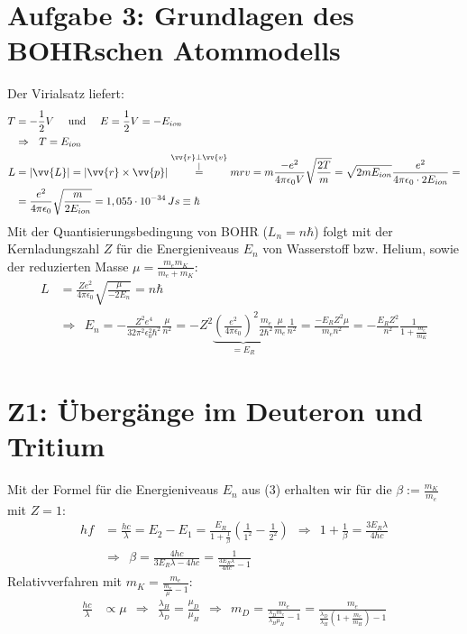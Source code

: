 \documentclass[a4paper,12pt]{article}
\begin{document}
\section*{Aufgabe 3: Grundlagen des BOHRschen Atommodells}
Der Virialsatz liefert:
\begin{align*}
T&=-\frac{1}{2}V\ \ \ \ \mathrm{und }\ \ \ \ E=\frac{1}{2}V=-E_{ion}\\
&\Rightarrow\ \ T=E_{ion}\\
L&=|\vv{L}|=|\vv{r}\times\vv{p}|\overset{\substack{\vv{r}\bot \vv{v}\\|}}{=}mrv=m\frac{-e^2}{4\pi\epsilon_0 V}\sqrt{\frac{2T}{m}}=\sqrt{2mE_{ion}}\frac{e^2}{4\pi\epsilon_0 \cdot 2E_{ion}}= \\
&=\frac{e^2}{4\pi\epsilon_0}\sqrt{\frac{m}{2E_{ion}}}=1,055\cdot 10^{-34}\, Js\equiv\hbar
\end{align*}
Mit der Quantisierungsbedingung von BOHR ($L_n=n\hbar$) folgt mit der Kernladungszahl $Z$ für die Energieniveaus $E_n$ von Wasserstoff bzw. Helium, sowie der reduzierten Masse $\mu = \frac{m_em_K}{m_e+m_K}$:
\begin{align*}
L&=\frac{Ze^2}{4\pi\epsilon_0}\sqrt{\frac{\mu}{-2E_n}}=n\hbar\\ &\Rightarrow\ \ E_n=-\frac{Z^2e^4}{32\pi^2\epsilon_0^2\hbar^2}\frac{\mu}{n^2}=-Z^2\underbrace{\left(\frac{e^2}{4\pi\epsilon_0}\right)^2\frac{m_e}{2\hbar^2}}_{=E_R}\frac{\mu}{m_e}\frac{1}{n^2}=\frac{-E_RZ^2\mu}{m_en^2}=-\frac{E_RZ^2}{n^2}\frac{1}{1+\frac{m_e}{m_K}}
\end{align*}
\section*{Z1: Übergänge im Deuteron und Tritium}
Mit der Formel für die Energieniveaus $E_n$ aus (3) erhalten wir für die $\beta :=\frac{m_K}{m_e}$ mit $Z=1$:
\begin{align*}
hf&=\frac{hc}{\lambda}=E_2-E_1=\frac{E_R}{1+\frac{1}{\beta}}\left(\frac{1}{1^2}-\frac{1}{2^2}\right)\ \ \Rightarrow\ \ 1+\frac{1}{\beta} = \frac{3E_R\lambda}{4hc}\\
&\Rightarrow\ \ \beta = \frac{4hc}{3E_R\lambda -4hc}=\frac{1}{\frac{3E_R\lambda}{4hc}-1}
\end{align*}
Relativverfahren mit $m_K=\frac{m_e}{\frac{m_e}{\mu}-1}$:
\begin{align*}
\frac{hc}{\lambda}&\propto\mu \ \ \Rightarrow\ \ \frac{\lambda_H}{\lambda_D}=\frac{\mu_D}{\mu_H}\ \ \Rightarrow\ \ m_D=\frac{m_e}{\frac{\lambda_D m_e}{\lambda_H\mu_H}-1}=\frac{m_e}{\frac{\lambda_D}{\lambda_H}(1+\frac{m_e}{m_H})-1}
\end{align*}
\end{document}
